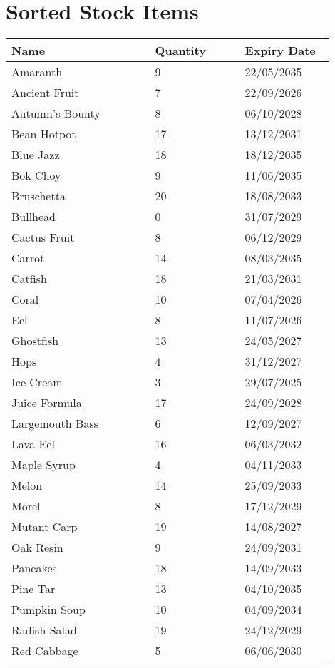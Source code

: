 \documentclass{article}
\begin{document}
\section*{Sorted Stock Items}
\begin{longtable}{|p{0.4\linewidth}|p{0.25\linewidth}|p{0.25\linewidth}|}\hline
\textbf{Name} & \textbf{Quantity} & \textbf{Expiry Date}\\
\hline
Amaranth & 9 & 22/05/2035 \\
\hline
Ancient Fruit & 7 & 22/09/2026 \\
\hline
Autumn's Bounty & 8 & 06/10/2028 \\
\hline
Bean Hotpot & 17 & 13/12/2031 \\
\hline
Blue Jazz & 18 & 18/12/2035 \\
\hline
Bok Choy & 9 & 11/06/2035 \\
\hline
Bruschetta & 20 & 18/08/2033 \\
\hline
Bullhead & 0 & 31/07/2029 \\
\hline
Cactus Fruit & 8 & 06/12/2029 \\
\hline
Carrot & 14 & 08/03/2035 \\
\hline
Catfish & 18 & 21/03/2031 \\
\hline
Coral & 10 & 07/04/2026 \\
\hline
Eel & 8 & 11/07/2026 \\
\hline
Ghostfish & 13 & 24/05/2027 \\
\hline
Hops & 4 & 31/12/2027 \\
\hline
Ice Cream & 3 & 29/07/2025 \\
\hline
Juice Formula & 17 & 24/09/2028 \\
\hline
Largemouth Bass & 6 & 12/09/2027 \\
\hline
Lava Eel & 16 & 06/03/2032 \\
\hline
Maple Syrup & 4 & 04/11/2033 \\
\hline
Melon & 14 & 25/09/2033 \\
\hline
Morel & 8 & 17/12/2029 \\
\hline
Mutant Carp & 19 & 14/08/2027 \\
\hline
Oak Resin & 9 & 24/09/2031 \\
\hline
Pancakes & 18 & 14/09/2033 \\
\hline
Pine Tar & 13 & 04/10/2035 \\
\hline
Pumpkin Soup & 10 & 04/09/2034 \\
\hline
Radish Salad & 19 & 24/12/2029 \\
\hline
Red Cabbage & 5 & 06/06/2030 \\

\end{longtable}
\end{document}
